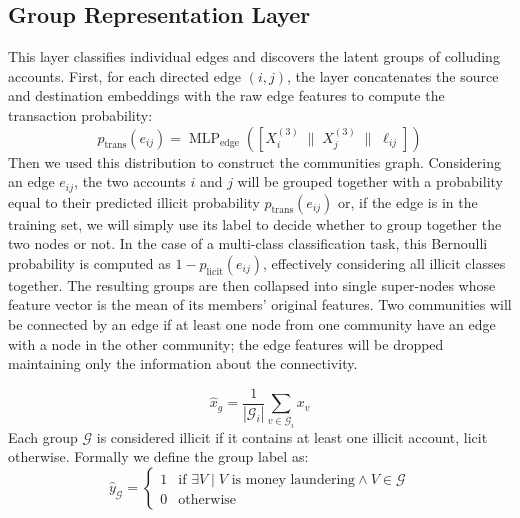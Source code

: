 \subsection{Group Representation Layer}
\label{sec:group_layer}
This layer classifies individual edges and discovers the latent groups of colluding accounts.
First, for each directed edge $(i,j)$, the layer concatenates the source and destination embeddings with the raw edge features to compute the transaction probability:
\begin{equation}
  p_{\text{trans}}(e_{ij}) = \operatorname{MLP}_{\text{edge}}\!\left([X^{(3)}_i \;\|\; X^{(3)}_j \;\|\; \ell_{ij}]\right)
\end{equation}
Then we used this distribution to construct the communities graph.
Considering an edge \(e_{ij}\), the two accounts \(i\) and \(j\) will be grouped together with a probability equal to their predicted illicit probability $p_{\text{trans}}(e_{ij})$ or, if the edge is in the training set, we will simply use its label to decide whether to group together the two nodes or not. In the case of a multi-class classification task, this Bernoulli probability is computed as $1 - p_{\text{licit}}(e_{ij})$, effectively considering all illicit classes together. The resulting groups are then collapsed into single super-nodes whose feature vector is the mean of its members' original features. Two communities will be connected by an edge if at least one node from one community have an edge with a node in the other community; the edge features will be dropped maintaining only the information about the connectivity.

\begin{equation}
  \hat{x}_g = \frac{1}{|\mathcal{G}_i|} \sum_{v \in \mathcal{G}_i} x_v
\end{equation}
Each group \(\mathcal{G}\) is considered illicit if it contains at least one illicit account, licit otherwise. Formally we define the group label as:
\begin{equation}
  \hat{y}_\mathcal{G} = \begin{cases}
    1 & \text{if } \exists V \; \vert  \; V \text{ is money laundering} \wedge V \in \mathcal{G} \\
    0 & \text{otherwise}
  \end{cases}
\end{equation}

